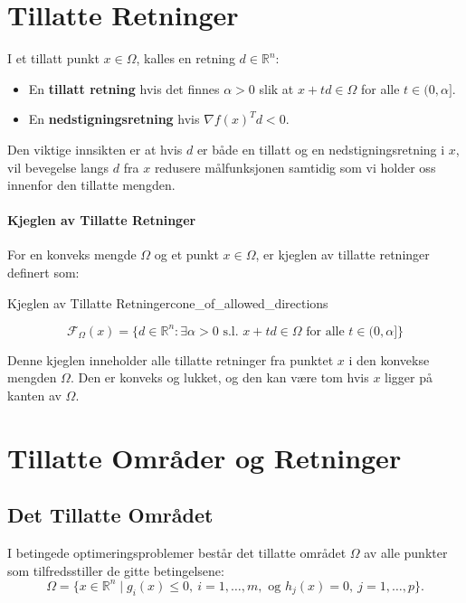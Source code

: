 \section{Tillatte Retninger}
I et tillatt punkt \( x \in \Omega \), kalles en retning \( d \in \mathbb{R}^n \):
\begin{itemize}
	\item En \textbf{tillatt retning} hvis det finnes \( \alpha > 0 \) slik at \( x + td \in \Omega \) for alle \( t \in (0, \alpha] \).
	\item En \textbf{nedstigningsretning} hvis \( \nabla f(x)^T d < 0 \).
\end{itemize}

Den viktige innsikten er at hvis \( d \) er både en tillatt og en nedstigningsretning i \( x \), vil bevegelse langs \( d \) fra \( x \) redusere målfunksjonen samtidig som vi holder oss innenfor den tillatte mengden.

\paragraph{Kjeglen av Tillatte Retninger}
For en konveks mengde \( \Omega \) og et punkt \( x \in \Omega \), er kjeglen av tillatte retninger definert som:
\begin{definition}{Kjeglen av Tillatte Retninger}{cone_of_allowed_directions}

	\[
		\mathcal{F}_\Omega(x) = \{d \in \mathbb{R}^n : \exists \alpha > 0 \text{ s.l. } x + td \in \Omega \text{ for alle } t \in (0, \alpha] \}
	\]
\end{definition}
Denne kjeglen inneholder alle tillatte retninger fra punktet \( x \) i den konvekse mengden \( \Omega \). Den er konveks og lukket, og den kan være tom hvis \( x \) ligger på kanten av \( \Omega \).

\section{Tillatte Områder og Retninger}

\subsection{Det Tillatte Området}
I betingede optimeringsproblemer består det tillatte området \(\Omega\) av alle punkter som tilfredsstiller de gitte betingelsene:
\begin{equation}
	\Omega = \{x \in \mathbb{R}^n \mid g_i(x) \leq 0,\ i = 1,\ldots,m, \text{ og } h_j(x) = 0,\ j = 1,\ldots,p\}.
\end{equation}

